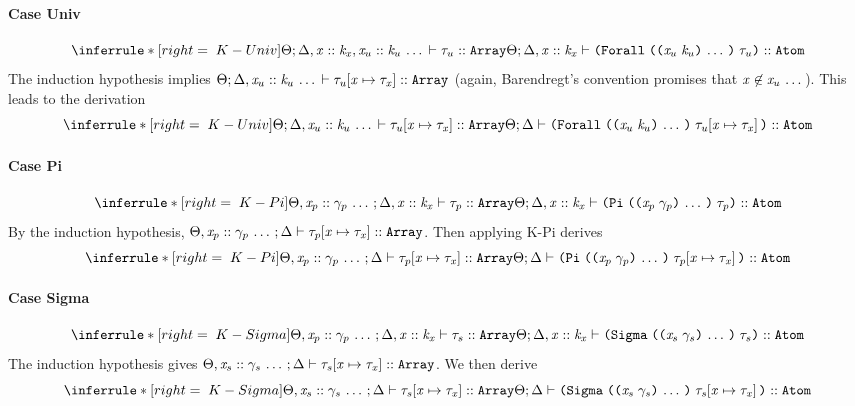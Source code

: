 \begin{sproof}
  \paragraph{Case {\sc Univ}}
  \[\infr[K-Univ]
  {\kindof
    {\sEnv}{\kEnv, \haskind{\var}{\kind_\var}, \sequence{\haskind{\var_u}{\kind_u}}}
    {\type_u}{\kindarray}}
  {\kindof
    {\sEnv}{\kEnv, \haskind{\var}{\kind_\var}}
    {\typeuniv{\sequence{\notevar{\var_u}{\kind_u}}}{\type_u}}{\kindatom}}\]
  The induction hypothesis implies
  $\Theta;\Delta, \mathit{x}_u :: \mathit{k}_u \, \ldots \, \vdash \mathit{\tau}_u\hspace{-2pt}\left[ \mathit{x} \mapsto \mathit{\tau}_{\mathit{x}} \right] :: \text{\tt Array}$
  (again, Barendregt's convention promises that $\mathit{x} \not\in \mathit{x}_u \, \ldots \,$).
  This leads to the derivation
  \[\infr[K-Univ]
  {\kindof
    {\sEnv}{\kEnv, \sequence{\haskind{\var_u}{\kind_u}}}
    {\typesubst{\type_u}}{\kindarray}}
  {\kindof
    {\sEnv}{\kEnv}
    {\typeuniv{\sequence{\notevar{\var_u}{\kind_u}}}{\typesubst{\type_u}}}{\kindatom}}\]

  \paragraph{Case {\sc Pi}}
  \[\infr[K-Pi]
  {\kindof{\sEnv, \sequence{\hassort{\var_p}{\sort_p}}}{\kEnv, \haskind{\var}{\kind_\var}}
    {\type_p}{\kindarray}}
  {\kindof{\sEnv}{\kEnv, \haskind{\var}{\kind_\var}}
    {\typedprod{\sequence{\notevar{\var_p}{\sort_p}}}{\type_p}}
    {\kindatom}}\]
  By the induction hypothesis,
  $\Theta, \mathit{x}_p :: \mathit{\gamma}_p \, \ldots \,;\Delta \vdash \mathit{\tau}_p\hspace{-2pt}\left[ \mathit{x} \mapsto \mathit{\tau}_{\mathit{x}} \right] :: \text{\tt Array}$.
  Then applying {\sc K-Pi} derives
  \[\infr[K-Pi]
  {\kindof{\sEnv, \sequence{\hassort{\var_p}{\sort_p}}}{\kEnv}
    {\typesubst{\type_p}}{\kindarray}}
  {\kindof{\sEnv}{\kEnv}
    {\typedprod{\sequence{\notevar{\var_p}{\sort_p}}}{\typesubst{\type_p}}}
    {\kindatom}}\]

  \paragraph{Case {\sc Sigma}}
  \[\infr[K-Sigma]
  {\kindof{\sEnv, \sequence{\hassort{\var_p}{\sort_p}}}{\kEnv, \haskind{\var}{\kind_\var}}
    {\type_s}{\kindarray}}
  {\kindof{\sEnv}{\kEnv, \haskind{\var}{\kind_\var}}
    {\typedsum{\sequence{\notevar{\var_s}{\sort_s}}}{\type_s}}
    {\kindatom}}\]
  The induction hypothesis gives
  $\Theta, \mathit{x}_s :: \mathit{\gamma}_s \, \ldots \,;\Delta \vdash \mathit{\tau}_s\hspace{-2pt}\left[ \mathit{x} \mapsto \mathit{\tau}_{\mathit{x}} \right] :: \text{\tt Array}$.
  We then derive
  \[\infr[K-Sigma]
  {\kindof{\sEnv, \sequence{\hassort{\var_s}{\sort_s}}}{\kEnv}
    {\typesubst{\type_s}}{\kindarray}}
  {\kindof{\sEnv}{\kEnv}
    {\typedsum{\sequence{\notevar{\var_s}{\sort_s}}}{\typesubst{\type_s}}}
    {\kindatom}}\]
 

\end{sproof}
